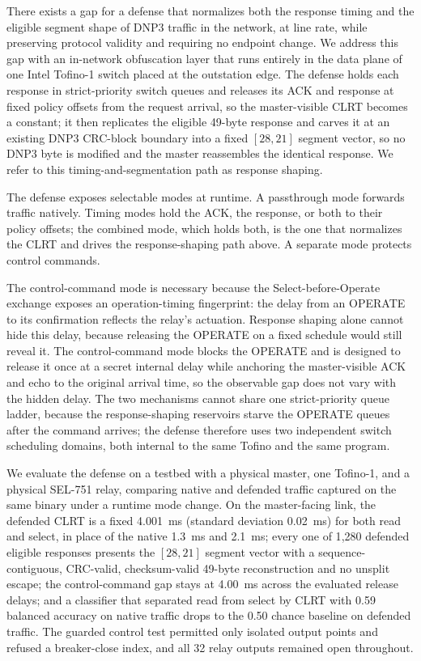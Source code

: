 There exists a gap for a defense that normalizes both the response timing and the eligible segment
shape of DNP3 traffic in the network, at line rate, while preserving protocol validity and requiring
no endpoint change. We address this gap with an in-network obfuscation layer that runs entirely in the
data plane of one Intel Tofino-1 switch placed at the outstation edge. The defense holds each response
in strict-priority switch queues and releases its ACK and response at fixed policy offsets from the
request arrival, so the master-visible CLRT becomes a constant; it then replicates the eligible
49-byte response and carves it at an existing DNP3 CRC-block boundary into a fixed $[28,21]$ segment
vector, so no DNP3 byte is modified and the master reassembles the identical response. We refer to this
timing-and-segmentation path as response shaping.

The defense exposes selectable modes at runtime. A passthrough mode forwards traffic natively. Timing
modes hold the ACK, the response, or both to their policy offsets; the combined mode, which holds both,
is the one that normalizes the CLRT and drives the response-shaping path above. A separate mode
protects control commands.

The control-command mode is necessary because the Select-before-Operate exchange exposes an
operation-timing fingerprint: the delay from an OPERATE to its confirmation reflects the relay's
actuation. Response shaping alone cannot hide this delay, because releasing the OPERATE on a fixed
schedule would still reveal it. The control-command mode blocks the OPERATE and is designed to release
it once at a secret internal delay while anchoring the master-visible ACK and echo to the original
arrival time, so the observable gap does not vary with the hidden delay. The two mechanisms cannot
share one strict-priority queue ladder, because the response-shaping reservoirs starve the OPERATE
queues after the command arrives; the defense therefore uses two independent switch scheduling domains,
both internal to the same Tofino and the same program.

We evaluate the defense on a testbed with a physical master, one Tofino-1, and a physical SEL-751 relay,
comparing native and defended traffic captured on the same binary under a runtime mode change. On the
master-facing link, the defended CLRT is a fixed 4.001~ms (standard deviation 0.02~ms) for both read
and select, in place of the native 1.3~ms and 2.1~ms; every one of 1{,}280 defended eligible responses
presents the $[28,21]$ segment vector with a sequence-contiguous, CRC-valid, checksum-valid 49-byte
reconstruction and no unsplit escape; the control-command gap stays at 4.00~ms across the evaluated
release delays; and a classifier that separated read from select by CLRT with 0.59 balanced accuracy
on native traffic drops to the 0.50 chance baseline on defended traffic. The guarded control test
permitted only isolated output points and refused a breaker-close index, and all 32 relay outputs
remained open throughout.

